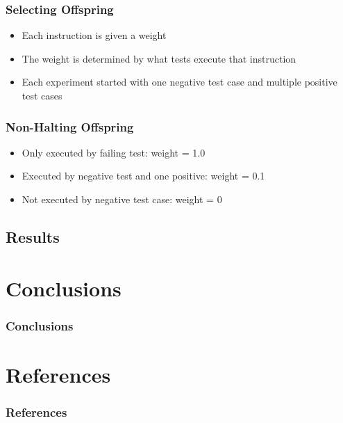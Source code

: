 \documentclass{beamer}
\begin{document}
\begin{frame}
  \frametitle{Selecting Offspring}
  \begin{itemize}
  \item Each instruction is given a weight
  \item The weight is determined by what tests execute that instruction
  \item Each experiment started with one negative test case and multiple positive test cases
  \end{itemize}
\end{frame}

\begin{frame}
  \frametitle{Non-Halting Offspring}
  
    \begin{itemize}
  	\item Only executed by failing test: weight = 1.0
  	\item Executed by negative test and one positive: weight = 0.1
  	\item Not executed by negative test case: weight = 0
  \end{itemize}
\end{frame}

\subsection[Results]{Results}

\section[Conclusions]{Conclusions}

\begin{frame}
\frametitle{Conclusions}
\end{frame}

\section*{References}

\begin{frame} 
	\frametitle{References} 
	
	\begin{thebibliography}{lskdjf}
  	\end{thebibliography}
\end{frame} 
\end{document}
